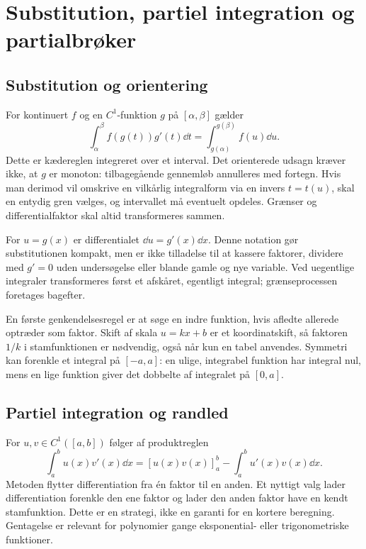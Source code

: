 \section{Substitution, partiel integration og partialbrøker}
\label{sec:integral-metoder}
\subsection{Substitution og orientering}
For kontinuert $f$ og en $C^1$-funktion $g$ på $[\alpha,\beta]$ gælder
\begin{equation}
 \int_\alpha^\beta f(g(t))g'(t)\dd t
 =\int_{g(\alpha)}^{g(\beta)}f(u)\dd u.
 \label{eq:substitution}
\end{equation}
Dette er kædereglen integreret over et interval. Det orienterede udsagn
kræver ikke, at $g$ er monoton: tilbagegående gennemløb annulleres med
fortegn. Hvis man derimod vil omskrive en vilkårlig integralform via en
invers $t=t(u)$, skal en entydig gren vælges, og intervallet må eventuelt
opdeles. Grænser og differentialfaktor skal altid transformeres sammen.

For $u=g(x)$ er differentialet $\dd u=g'(x)\dd x$. Denne notation gør
substitutionen kompakt, men er ikke tilladelse til at kassere faktorer,
dividere med $g'=0$ uden undersøgelse eller blande gamle og nye variable.
Ved uegentlige integraler transformeres først et afskåret, egentligt
integral; grænseprocessen foretages bagefter.

En første genkendelsesregel er at søge en indre funktion, hvis afledte
allerede optræder som faktor. Skift af skala $u=kx+b$ er et koordinatskift,
så faktoren $1/k$ i stamfunktionen er nødvendig, også når kun en tabel
anvendes. Symmetri kan forenkle et integral på $[-a,a]$: en ulige,
integrabel funktion har integral nul, mens en lige funktion giver det
dobbelte af integralet på $[0,a]$.

\subsection{Partiel integration og randled}
For $u,v\in C^1([a,b])$ følger af produktreglen
\begin{equation}
 \int_a^b u(x)v'(x)\dd x
 =[u(x)v(x)]_a^b-\int_a^b u'(x)v(x)\dd x.
 \label{eq:partiel}
\end{equation}
Metoden flytter differentiation fra én faktor til en anden. Et nyttigt
valg lader differentiation forenkle den ene faktor og lader den anden
faktor have en kendt stamfunktion. Dette er en strategi, ikke en garanti
for en kortere beregning. Gentagelse er relevant for polynomier gange
eksponential- eller trigonometriske funktioner.

